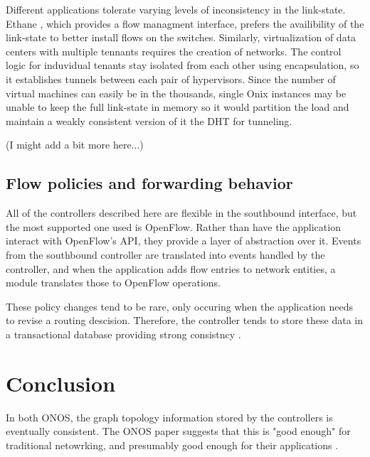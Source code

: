 \documentclass[letterpaper,twocolumn,10pt]{article}
\begin{document}
Different applications tolerate varying levels of inconsistency in the link-state. Ethane \cite{koponen2010onix}, which provides a flow managment interface, prefers the availibility of the link-state to better install flows on the switches. Similarly, virtualization of data centers with multiple tennants requires the creation of networks. The control logic for induvidual tenants stay isolated from each other using encapsulation, so it establishes tunnels between each pair of hypervisors. Since the number of virtual machines can easily be in the thousands, single Onix instances may be unable to keep the full link-state in memory so it would partition the load and maintain a weakly consistent version of it the DHT for tunneling.

(I might add a bit more here...)

\subsection*{Flow policies and forwarding behavior}

All of the controllers described here are flexible in the southbound interface, but the most supported one used is OpenFlow. Rather than have the application interact with OpenFlow's API, they provide a layer of abstraction over it. Events from the southbound controller are translated into events handled by the controller, and when the application adds flow entries to network entities, a module translates those to OpenFlow operations. 

These policy changes tend to be rare, only occuring when the application needs to revise a routing descision. Therefore, the controller tends to store these data in a transactional database providing strong consistncy \cite{koponen2010onix}.


\section{Conclusion}

In both ONOS, the graph topology information stored by the controllers is eventually consistent. The ONOS paper suggests that this is "good enough" for traditional netowrking, and presumably good enough for their applications \cite{berde2014onos}. 
\end{document}
